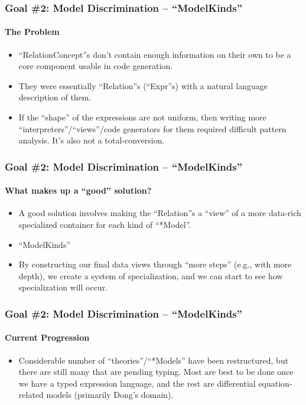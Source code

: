 \documentclass{beamer}
\begin{document}
\begin{frame}
    \frametitle{Goal \#2: Model Discrimination -- ``ModelKinds''}
    \framesubtitle{The Problem}
    
    \begin{itemize}
        \item<2-> ``RelationConcept''s don't contain enough information on their own to be a core component usable in code generation.
        \item<3-> They were essentially ``Relation''s (``Expr''s) with a natural language description of them.
        \item<4-> If the ``shape'' of the expressions are not uniform, then writing more ``interpreters''/``views''/code generators for them required difficult pattern analysis. It's also not a total-conversion.
    \end{itemize}
\end{frame}

\begin{frame}
    \frametitle{Goal \#2: Model Discrimination -- ``ModelKinds''}
    \framesubtitle{What makes up a ``good'' solution?}
    
    \begin{itemize}
        \item<2-> A good solution involves making the ``Relation''s a ``view'' of a more data-rich specialized container for each kind of ``*Model''.
        \item<3-> ``ModelKinds''
        \item<4-> By constructing our final data views through ``more steps'' (e.g., with more depth), we create a system of specialization, and we can start to see how specialization will occur.
    \end{itemize}
\end{frame}

\begin{frame}
    \frametitle{Goal \#2: Model Discrimination -- ``ModelKinds''}
    \framesubtitle{Current Progression}
    
    \begin{itemize}
        \item<2-> Considerable number of ``theories''/``*Models'' have been restructured, but there are still many that are pending typing. Most are best to be done once we have a typed expression language, and the rest are differential equation-related models (primarily Dong's domain).
    \end{itemize}
\end{frame}
\end{document}

